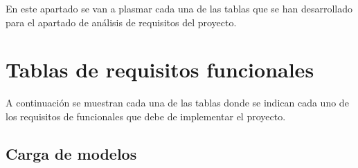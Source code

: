 En este apartado se van a plasmar cada una de las tablas que se han desarrollado
para el apartado de análisis de requisitos del proyecto.

\section{Tablas de requisitos funcionales}

A continuación se muestran cada una de las tablas donde se indican cada uno de
los requisitos de funcionales que debe de implementar el proyecto.

\subsection{Carga de modelos}

